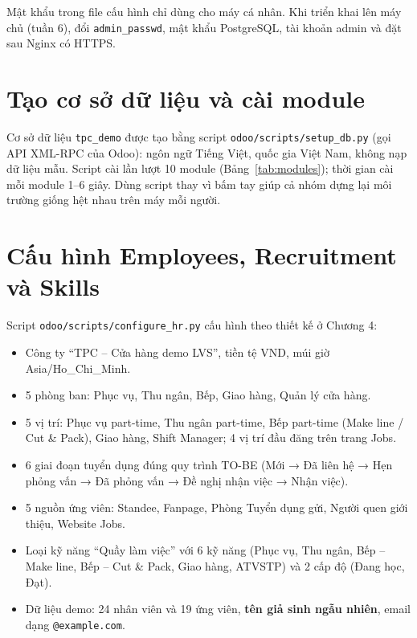 \documentclass[12pt,a4paper,oneside]{report}
\begin{document}




\begin{canxacnhan}
Mật khẩu trong file cấu hình chỉ dùng cho máy cá nhân. Khi triển khai lên máy chủ (tuần 6), đổi \texttt{admin\_passwd}, mật khẩu PostgreSQL, tài khoản admin và đặt sau Nginx có HTTPS.
\end{canxacnhan}

\section{Tạo cơ sở dữ liệu và cài module}
Cơ sở dữ liệu \texttt{tpc\_demo} được tạo bằng script \texttt{odoo/scripts/setup\_db.py} (gọi API XML-RPC của Odoo): ngôn ngữ Tiếng Việt, quốc gia Việt Nam, không nạp dữ liệu mẫu. Script cài lần lượt 10 module (Bảng~\ref{tab:modules}); thời gian cài mỗi module 1–6 giây. Dùng script thay vì bấm tay giúp cả nhóm dựng lại môi trường giống hệt nhau trên máy mỗi người.

\section{Cấu hình Employees, Recruitment và Skills}
Script \texttt{odoo/scripts/configure\_hr.py} cấu hình theo thiết kế ở Chương 4:
\begin{itemize}
\item Công ty ``TPC – Cửa hàng demo LVS'', tiền tệ VND, múi giờ Asia/Ho\_Chi\_Minh.
\item 5 phòng ban: Phục vụ, Thu ngân, Bếp, Giao hàng, Quản lý cửa hàng.
\item 5 vị trí: Phục vụ part-time, Thu ngân part-time, Bếp part-time (Make line / Cut \& Pack), Giao hàng, Shift Manager; 4 vị trí đầu đăng trên trang Jobs.
\item 6 giai đoạn tuyển dụng đúng quy trình TO-BE (Mới → Đã liên hệ → Hẹn phỏng vấn → Đã phỏng vấn → Đề nghị nhận việc → Nhận việc).
\item 5 nguồn ứng viên: Standee, Fanpage, Phòng Tuyển dụng gửi, Người quen giới thiệu, Website Jobs.
\item Loại kỹ năng ``Quầy làm việc'' với 6 kỹ năng (Phục vụ, Thu ngân, Bếp – Make line, Bếp – Cut \& Pack, Giao hàng, ATVSTP) và 2 cấp độ (Đang học, Đạt).
\item Dữ liệu demo: 24 nhân viên và 19 ứng viên, \textbf{tên giả sinh ngẫu nhiên}, email dạng \texttt{@example.com}.
\end{itemize}
\end{document}
